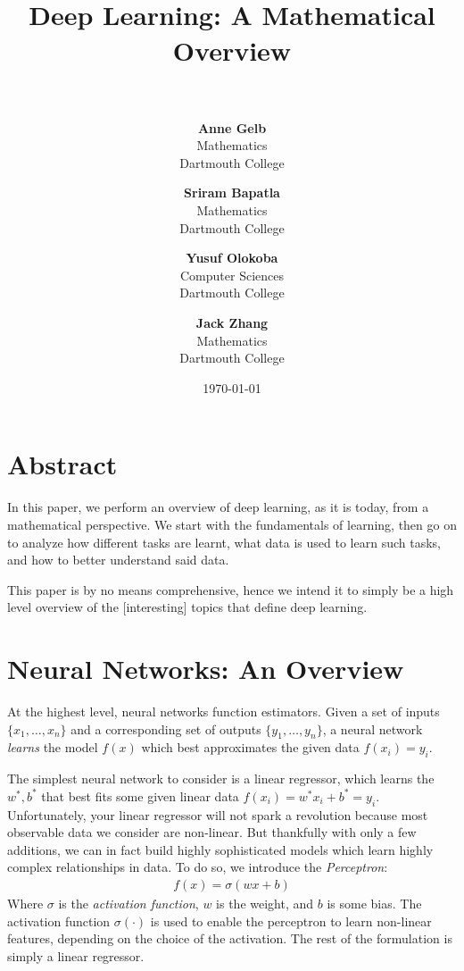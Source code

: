 \documentclass[paper=a4, fontsize=12pt]{scrartcl} %
\title{	
    \normalfont \normalsize 
    \horrule{3pt} \\[0.4cm] %
    \LARGE \textbf{Deep Learning: A Mathematical Overview} \\[0.1cm] %
    \horrule{1pt} \\[0.5cm] %
}
\author{
    \footnotesize \textbf{Anne Gelb} \\[-0.3cm]
    \footnotesize Mathematics \\[-0.3cm]
    \footnotesize Dartmouth College
    \and
    \footnotesize \textbf{Sriram Bapatla} \\[-0.3cm]
    \footnotesize Mathematics \\[-0.3cm]
    \footnotesize Dartmouth College
    \and
    \footnotesize \textbf{Yusuf Olokoba} \\[-0.3cm]
    \footnotesize Computer Sciences \\[-0.3cm]
    \footnotesize Dartmouth College
    \and
    \footnotesize \textbf{Jack Zhang} \\[-0.3cm]
    \footnotesize Mathematics \\[-0.3cm]
    \footnotesize Dartmouth College
} %
\date{\normalsize\today} %
\numberwithin{equation}{section} %
\numberwithin{figure}{section} %
\numberwithin{table}{section} %
\begin{document}
\maketitle %


\section*{Abstract}

In this paper, we perform an overview of deep learning, as it is today, from a mathematical perspective.
We start with the fundamentals of learning, then go on to analyze how different tasks are learnt, what data 
is used to learn such tasks, and how to better understand said data.

This paper is by no means comprehensive, hence we intend it to simply be a high level overview of the [interesting] 
topics that define deep learning.

\pagebreak


\tableofcontents

\pagebreak


\section{Neural Networks: An Overview}

At the highest level, neural networks function estimators. Given a set of inputs $\{ x_1, \ldots, x_n \}$ and 
a corresponding set of outputs $\{ y_1, \ldots, y_n \}$, a neural network \textit{learns} the model $f(x)$ which 
best approximates the given data $f(x_i) = y_i$.

The simplest neural network to consider is a linear regressor, which learns the $w^*, b^*$ that best 
fits some given linear data $f(x_i) = w^* x_i + b^* = y_i$. Unfortunately, your linear regressor will not spark a revolution 
because most observable data we consider are non-linear. But thankfully with only a few additions, we can in fact build 
highly sophisticated models which learn highly complex relationships in data. To do so, we introduce the \textit{Perceptron}:
\begin{align*}
    f(x) = \sigma(wx + b)
\end{align*}
Where $\sigma$ is the \textit{activation function}, $w$ is the weight, and $b$ is some bias. The activation function $\sigma(\cdot)$ is used to
enable the perceptron to learn non-linear features, depending on the choice of the activation. The rest of the formulation is simply a linear 
regressor.
\end{document}
